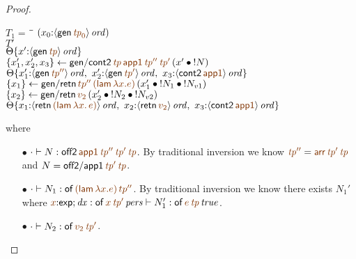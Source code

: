 \begin{proof}
\begin{description}
\begin{tabbing}
$T_1 = ~$ \= \qquad \= $(x_0{:}\istrue{\susp{{\sf gen}\,\lf{{\it tp}_0}}})$
\\
\>$T'$
\\
\>\>$\tackon{\Theta}{x'{:}\istrue{\susp{{\sf gen}\,\lf{{\it tp}}}}}$
\\
\>$\trstep{x_1', x_2', x_3}
     {{\sf gen/cont2}\,\lf{{\it tp}}\,\lf{\sf app1}\,
         \lf{{\it tp}''}\,\lf{{\it tp}'}\,
         (\tfuser{x'}{\tbangr{N}})}$
\\ %
\>\>$\tackon{\Theta}
     {x_1'{:}\istrue{\susp{{\sf gen}\,\lf{{\it tp}''}}}, ~
      x_2'{:}\istrue{\susp{{\sf gen}\,\lf{{\it tp}'}}}, ~
      x_3{:}\istrue{\susp{{\sf cont2}\,\lf{\sf app1}}}}$
\\
\>$\trstep{x_1}
     {{\sf gen/retn}\,\lf{tp''}\,\lf{({\sf lam}\,\lambda x.e)}\,}
         (\tfuser{x_1'}{\tfuser{\tbangr{N_1}}{\tbangr{N_{v1}}}})$
\\
\>$\trstep{x_2}
     {{\sf gen/retn}\,\lf{v_2}\,(\tfuser{x_2'}{\tfuser{\tbangr{N_2}}{\tbangr{N_{v2}}}})}$
\\
\>\>$\tackon{\Theta}{x_1{:}\istrue{\susp{{\sf retn}\,\lf{({\sf lam}\,\lambda x.\,e)}}}, ~
                   x_2{:}\istrue{\susp{{\sf retn}\,\lf{v_2}}}, ~
                   x_3{:}\istrue{\susp{{\sf cont2}\,\lf{\sf app1}}}}$
\end{tabbing}
where
\begin{itemize}
\item[$\bullet$] $\cdot \vdash N : {\sf off2}\,\lf{\sf app1}\,\lf{{\it
      tp}''}\,\lf{{\it tp}'}\,\lf{{\it tp}}$.  By traditional
  inversion we know $\lf{\it{tp}''} = \lf{{\sf arr}\,{\it tp}'\,{\it
      tp}}$ and $N = {\sf off2/app1}\,\lf{{\it tp}'}\,\lf{{\it tp}}$.
\item[$\bullet$] $\cdot \vdash N_1 : {\sf of}\,\lf{({\sf lam}\,\lambda
    x.e)}\,\lf{tp''}$. By traditional inversion we know there 
    exists $N_1'$ where 
    $\lf{x}{:}{\sf exp}; {\it dx} : \ispers{{\sf of}\,\lf{x}\,\lf{\it
      tp'}} \vdash N_1' : \isconc{{\sf of}\,\lf{e}\,\lf{\it
        tp}}$.
\item[$\bullet$] $\cdot \vdash N_2 : {\sf of}\,\lf{v_2}\,\lf{{\it tp}'}$.
\end{itemize}


\end{description}
\end{proof}
